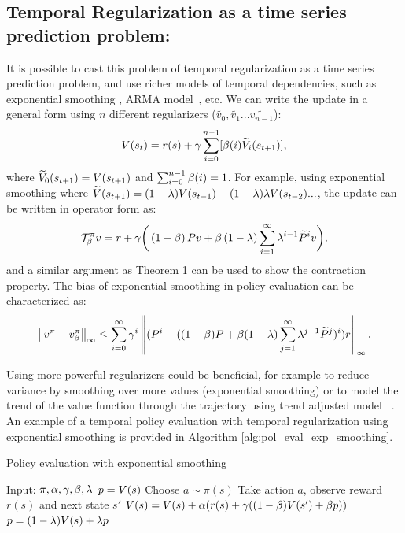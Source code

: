 \subsection{Temporal Regularization as a time series prediction problem:}
It is possible to cast this problem of temporal regularization as a time series prediction problem, and use richer models of temporal dependencies, such as exponential smoothing \cite{gardner2006exponential}, ARMA model~\cite{box94}, etc. We can write the update in a general form using $n$ different regularizers ($\widetilde{v_0},\widetilde{v_1}...\widetilde{v_{n-1}}$):
\begin{equation}
    V(s_t) = r(s) + \gamma \sum_{i=0}^{n-1} [\beta(i) \widetilde{V}_i(s_{t+1})],
\end{equation}
where $\widetilde{V}_0(s_{t+1}) = V(s_{t+1})$ and $\sum_{i=0}^{n-1} \beta(i) = 1$. For example, using exponential smoothing where $\widetilde{V}(s_{t+1}) = (1-\lambda) V(s_{t-1}) + (1-\lambda)\lambda V(s_{t-2})...$, the update can be written in operator form as:
\begin{equation}
    \label{eq:exp_smooth}
    \mathcal{T}^{\pi}_{\beta} v = r + \gamma \bigg(\left(1-\beta\right) Pv + \beta \left(1-\lambda\right) \sum_{i=1}^{\infty} \lambda^{i-1} \widetilde{P}^i v\bigg),
\end{equation}
and a similar argument as Theorem 1 can be used to show the contraction property. The bias of exponential smoothing in policy evaluation can be characterized as:
\begin{equation}
        \left\lVert v^{\pi} - v^{\pi}_{\beta}\right\rVert_{\infty} \leq  \sum_{i=0}^{\infty} \gamma^i \left\lVert (P^i-((1-\beta) P + \beta (1-\lambda) \sum_{j=1}^{\infty} \lambda^{j-1} \widetilde{P}^j)^i) r\right\rVert_{\infty}.
\end{equation}

Using more powerful regularizers could be beneficial, for example to reduce variance by smoothing over more values (exponential smoothing) or to model the trend of the value function through the trajectory using trend adjusted model ~\cite{gardner1985exponential}. An example of a temporal policy evaluation with temporal regularization using exponential smoothing is provided in Algorithm \ref{alg:pol_eval_exp_smoothing}.
\begin{algorithm}[H]
\caption{Policy evaluation with exponential smoothing}
\begin{algorithmic}[1]
    \STATE Input: $\pi,\alpha,\gamma,\beta,\lambda$
    \STATE $p = V(s)$
        \STATE Choose $a \sim \pi(s)$
        \STATE Take action $a$, observe reward $r(s)$ and next state $s'$
        \STATE $V(s) = V(s) +  \alpha (r(s) + \gamma ( (1-\beta) V(s') + \beta p)) $
        \STATE $p = (1-\lambda)V(s) + \lambda p$
    \ENDFOR
\end{algorithmic}
\label{alg:pol_eval_exp_smoothing}
\end{algorithm}


